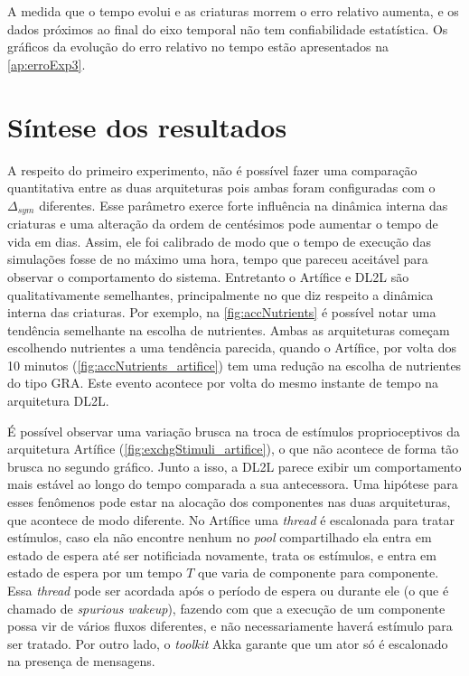 A medida que o tempo evolui e as criaturas morrem o erro relativo aumenta, e os dados próximos ao final do eixo temporal não tem confiabilidade estatística. Os gráficos da evolução do erro relativo no tempo estão apresentados na \autoref{ap:erroExp3}.

\section{Síntese dos resultados}
\label{sec:sintese}

A respeito do primeiro experimento, não é possível fazer uma comparação quantitativa entre as duas arquiteturas pois ambas foram configuradas com o $\Delta_{sym}$ diferentes. Esse parâmetro exerce forte influência na dinâmica interna das criaturas e uma alteração da ordem de centésimos pode aumentar o tempo de vida em dias.  Assim, ele foi calibrado de modo que o tempo de execução das simulações fosse de no máximo uma hora, tempo que pareceu aceitável para observar o comportamento do sistema.  Entretanto o Artífice e DL2L são qualitativamente semelhantes, principalmente no que diz respeito a dinâmica interna das criaturas. Por exemplo, na \autoref{fig:accNutrients} é possível notar uma tendência semelhante na escolha de nutrientes. Ambas as arquiteturas começam escolhendo nutrientes a uma tendência parecida, quando o Artífice, por volta dos 10 minutos (\autoref{fig:accNutrients_artifice}) tem uma redução na escolha de nutrientes do tipo GRA. Este evento acontece por volta do mesmo instante de tempo na arquitetura DL2L.

É possível observar uma variação brusca na troca de estímulos proprioceptivos da arquitetura Artífice (\autoref{fig:exchgStimuli_artifice}), o que não acontece de forma tão brusca no segundo gráfico. Junto a isso, a DL2L parece exibir um comportamento mais estável ao longo do tempo comparada a sua antecessora. Uma hipótese para esses fenômenos pode estar na alocação dos componentes nas duas arquiteturas, que acontece de modo diferente. No Artífice uma \textit{thread} é escalonada para tratar estímulos, caso ela não encontre nenhum no \textit{pool} compartilhado ela entra em estado de espera até ser notificiada novamente, trata os estímulos, e entra em estado de espera por um tempo $T$ que varia de componente para componente. Essa \textit{thread} pode ser acordada após o período de espera ou durante ele (o que é chamado de \textit{spurious wakeup}), fazendo com que a execução de um componente possa vir de vários fluxos diferentes, e não necessariamente haverá estímulo para ser tratado. Por outro lado, o \textit{toolkit} Akka garante que um ator só é escalonado na presença de mensagens.

